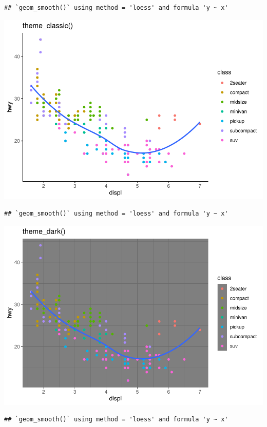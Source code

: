 \documentclass[
]{article}
\begin{document}
\begin{verbatim}
## `geom_smooth()` using method = 'loess' and formula 'y ~ x'
\end{verbatim}

\includegraphics{rmarkdown_tutorial_files/figure-latex/unnamed-chunk-32-2.pdf}

\begin{verbatim}
## `geom_smooth()` using method = 'loess' and formula 'y ~ x'
\end{verbatim}

\includegraphics{rmarkdown_tutorial_files/figure-latex/unnamed-chunk-32-3.pdf}

\begin{verbatim}
## `geom_smooth()` using method = 'loess' and formula 'y ~ x'
\end{verbatim}
\end{document}

